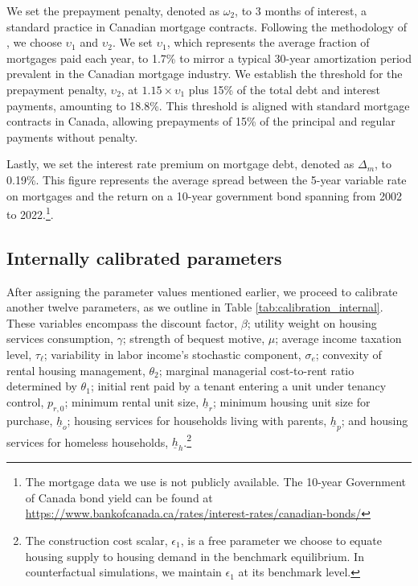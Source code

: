 \documentclass[parskip=full]{article}
\begin{document}
We set the prepayment penalty, denoted as $\omega_{2}$, to 3 months of interest, a standard practice in Canadian mortgage contracts. Following the methodology of \citet{rs-2023}, we choose $\upsilon_{1}$ and $\upsilon_{2}$. We set $\upsilon_{1}$, which represents the average fraction of mortgages paid each year, to 1.7\% to mirror a typical 30-year amortization period prevalent in the Canadian mortgage industry. We establish the threshold for the prepayment penalty, $\upsilon_{2}$, at $1.15 \times \upsilon_{1}$ plus 15\% of the total debt and interest payments, amounting to 18.8\%. This threshold is aligned with standard mortgage contracts in Canada, allowing prepayments of 15\% of the principal and regular payments without penalty.

Lastly, we set the interest rate premium on mortgage debt, denoted as $\Delta_{m}$, to 0.19\%. This figure represents the average spread between the 5-year variable rate on mortgages and the return on a 10-year government bond spanning from 2002 to 2022.\footnote{The mortgage data we use is not publicly available. The 10-year Government of Canada bond yield can be found at \url{https://www.bankofcanada.ca/rates/interest-rates/canadian-bonds/}}.

\subsection{Internally calibrated parameters}

After assigning the parameter values mentioned earlier, we proceed to calibrate another twelve parameters, as we outline in Table \ref{tab:calibration_internal}. These variables encompass the discount factor, $\beta$; utility weight on housing services consumption, $\gamma$; strength of bequest motive, $\mu$; average income taxation level, $\tau_{\ell}$; variability in labor income's stochastic component, $\sigma_{e}$; convexity of rental housing management, $\theta_{2}$; marginal managerial cost-to-rent ratio determined by $\theta_{1}$; initial rent paid by a tenant entering a unit under tenancy control, $p_{r,0}$; minimum rental unit size, $\underline{h}_{r}$; minimum housing unit size for purchase, $\underline{h}_{o}$; housing services for households living with parents, $\underline{h}_{p}$; and housing services for homeless households, $\underline{h}_{h}$.\footnote{The construction cost scalar, $\epsilon_{1}$, is a free parameter we choose to equate housing supply to housing demand in the benchmark equilibrium. In counterfactual simulations, we maintain $\epsilon_{1}$ at its benchmark level.}
\end{document}
